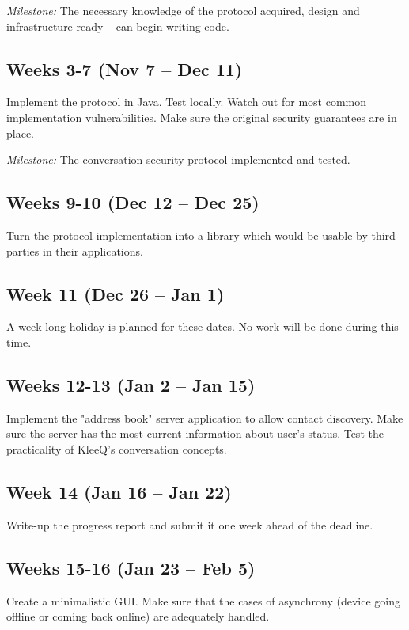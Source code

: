 \documentclass[a4paper, 12pt]{report}
\begin{document}
\begin{appendices}
\vspace{0.7\baselineskip}
\noindent
\textit{Milestone:} The necessary knowledge of the protocol acquired, design and infrastructure ready -- can begin writing code.

\subsection*{Weeks 3-7 (Nov 7 -- Dec 11)}
Implement the protocol in Java. Test locally. Watch out for most common implementation vulnerabilities. Make sure the original security guarantees are in place.

\vspace{0.7\baselineskip}
\noindent
\textit{Milestone:} The conversation security protocol implemented and tested.

\subsection*{Weeks 9-10 (Dec 12 -- Dec 25)}
Turn the protocol implementation into a library which would be usable by third parties in their applications.

\subsection*{Week 11 (Dec 26 -- Jan 1)}
A week-long holiday is planned for these dates. No work will be done during this time.

\subsection*{Weeks 12-13 (Jan 2 -- Jan 15)}
Implement the "address book" server application to allow contact discovery. Make sure the server has the most current information about user's status. Test the practicality of KleeQ's conversation concepts.

\subsection*{Week 14 (Jan 16 -- Jan 22)}
Write-up the progress report and submit it one week ahead of the deadline.

\subsection*{Weeks 15-16 (Jan 23 -- Feb 5)}
Create a minimalistic GUI. Make sure that the cases of asynchrony (device going offline or coming back online) are adequately handled.


\end{appendices}
\end{document}
